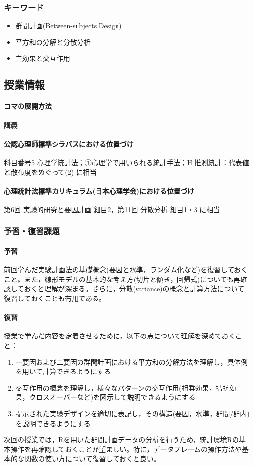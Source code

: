 \subsubsection{キーワード}
\begin{itemize}
	\item 群間計画(Between-subjects Design)
	\item 平方和の分解と分散分析
	\item 主効果と交互作用
\end{itemize}
\subsection{授業情報}
\paragraph{コマの展開方法}
講義
\paragraph{公認心理師標準シラバスにおける位置づけ}
科目番号5 心理学統計法；①心理学で用いられる統計手法；H 推測統計：代表値と散布度をめぐって(2) に相当
\paragraph{心理統計法標準カリキュラム(日本心理学会)における位置づけ}
第6回 実験的研究と要因計画 細目2，第11回 分散分析 細目1・3 に相当
\subsubsection{予習・復習課題}
\paragraph{予習}
前回学んだ実験計画法の基礎概念(要因と水準，ランダム化など)を復習しておくこと。また，線形モデルの基本的な考え方(切片と傾き，回帰式)についても再確認しておくと理解が深まる。さらに，分散(variance)の概念と計算方法について復習しておくことも有用である。

\paragraph{復習}
授業で学んだ内容を定着させるために，以下の点について理解を深めておくこと：

\begin{enumerate}
\item 一要因および二要因の群間計画における平方和の分解方法を理解し，具体例を用いて計算できるようにする
\item 交互作用の概念を理解し，様々なパターンの交互作用(相乗効果，拮抗効果，クロスオーバーなど)を図示して説明できるようにする
\item 提示された実験デザインを適切に表記し，その構造(要因，水準，群間/群内)を説明できるようにする
\end{enumerate}

次回の授業では，Rを用いた群間計画データの分析を行うため，統計環境Rの基本操作を再確認しておくことが望ましい。特に，データフレームの操作方法や基本的な関数の使い方について復習しておくと良い。
